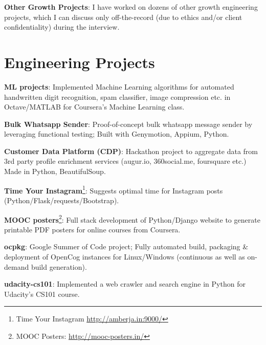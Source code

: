 \documentclass[overlapped,centered]{resume}
\begin{document}
\begin{resume}
\begin{list2}
	\item \textbf{Other Growth Projects}: I have worked on dozens of other growth engineering projects, which I can discuss only off-the-record (due to ethics and/or client confidentiality) during the interview.
	
	\end{list2}

    \section{\mysidestyle Engineering Projects} 
	\begin{list2}
	
	\item \textbf{ML projects}: Implemented Machine Learning algorithms for automated handwritten digit recognition, spam classifier, image compression etc. in Octave/MATLAB for Coursera's Machine Learning class.
	
	\item \textbf{Bulk Whatsapp Sender}: Proof-of-concept bulk whatsapp message sender by leveraging functional testing; Built with Genymotion, Appium, Python.
	
	\item \textbf{Customer Data Platform (CDP)}: Hackathon project to aggregate data from 3rd party profile enrichment services (augur.io, 360social.me, foursquare etc.) Made in Python, BeautifulSoup.
	
	\item \textbf{Time Your Instagram}\footnote{Time Your Instagram \url{http://amberja.in:9000/}}: Suggests optimal time for Instagram posts (Python/Flask/requests/Bootstrap).
	
	\item \textbf{MOOC posters}\footnote{MOOC Posters: \url{http://mooc-posters.in/}}: Full stack development of Python/Django website to generate printable PDF posters for online courses from Coursera.
	
	\item \textbf{ocpkg}: Google Summer of Code project; Fully automated build, packaging \& deployment of OpenCog instances for Linux/Windows (continuous as well as on-demand build generation).
	
	\item \textbf{udacity-cs101}: Implemented a web crawler and search engine in Python for Udacity's CS101 course.
	
    \end{list2}


\end{resume}
\end{document}
